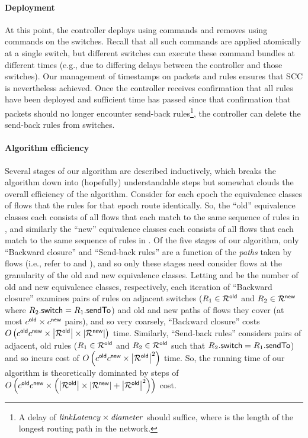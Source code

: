 \paragraph{Deployment}
At this point, the controller deploys \addRules using \flowAdd
commands and removes \deleteRules using \flowDel commands on the
switches.  Recall that all such commands are applied atomically at a
single switch, but different switches can execute these command
bundles at different times (e.g., due to differing delays between the
controller and those switches).  Our management of timestamps on
packets and rules ensures that SCC is nevertheless achieved.  Once the
controller receives confirmation that all rules have been deployed and
sufficient time has passed since that confirmation that packets should
no longer encounter send-back rules\footnote{A delay of $\mathit{linkLatency}
  \times \mathit{diameter}$ should suffice, where \netDiameter is the
  length of the longest routing path in the network.}, the controller
can delete the send-back rules from switches.

\paragraph{Algorithm efficiency}
Several stages of our algorithm are described inductively, which
breaks the algorithm down into (hopefully) understandable steps but
somewhat clouds the overall efficiency of the algorithm.  Consider for
each epoch the equivalence classes of flows that the rules for that
epoch route identically.  So, the ``old'' equivalence classes each
consists of all flows that each match to the same sequence of rules in
\oldRules, and similarly the ``new'' equivalence classes each consists
of all flows that each match to the same sequence of rules in
\newRules.  Of the five stages of our algorithm, only ``Backward
closure'' and ``Send-back rules'' are a function of the \textit{paths}
taken by flows (i.e., refer to \oldPath{\pktID{}} and
\newPath{\pktID{}}), and so only these stages need consider flows at
the granularity of the old and new equivalence classes.  Letting
\oldClasses and \newClasses be the number of old and new equivalence
classes, respectively, each iteration of ``Backward closure'' examines
pairs of rules on adjacent switches ($\ruleID{1} \in \oldRules$ and
$\ruleID{2} \in \newRules$ where $\ruleID{2}{\switchField} =
\ruleID{1}{\sendToField}$) and old and new paths of flows they cover
(at most $c^{\mathsf{old}} \times c^{\mathsf{new}}$ pairs), and so very
coarsely, ``Backward closure'' costs $O\left(c^{\mathsf{old}}c^{\mathsf{new}}
\times \left|{\mathcal{R}^{\mathsf{old}}}\right| \times \left|{\mathcal{R}^{\mathsf{new}}}\right|\right)$ time.
Similarly, ``Send-back rules'' considers pairs of adjacent, old rules
($\ruleID{1} \in \oldRules$ and $\ruleID{2} \in \oldRules$ such that
$\ruleID{2}{\switchField} = \ruleID{1}{\sendToField}$) and so incurs
cost of $O\left(c^{\mathsf{old}}c^{\mathsf{new}} \times
\left|{\mathcal{R}^{\mathsf{old}}}\right|^2\right)$ time.  So, the running time of our
algorithm is theoretically dominated by steps of
$O\left(c^{\mathsf{old}}c^{\mathsf{new}} \times \left(\left|{\mathcal{R}^{\mathsf{old}}}\right| \times
\left|{\mathcal{R}^{\mathsf{new}}}\right| + \left|{\mathcal{R}^{\mathsf{old}}}\right|^2\right)\right)$ cost.

